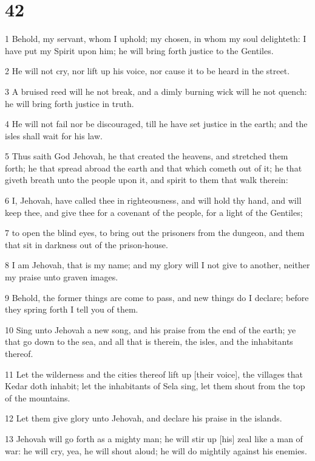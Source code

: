 \chapter{42}

\par 1 Behold, my servant, whom I uphold; my chosen, in whom my soul delighteth: I have put my Spirit upon him; he will bring forth justice to the Gentiles.
\par 2 He will not cry, nor lift up his voice, nor cause it to be heard in the street.
\par 3 A bruised reed will he not break, and a dimly burning wick will he not quench: he will bring forth justice in truth.
\par 4 He will not fail nor be discouraged, till he have set justice in the earth; and the isles shall wait for his law.
\par 5 Thus saith God Jehovah, he that created the heavens, and stretched them forth; he that spread abroad the earth and that which cometh out of it; he that giveth breath unto the people upon it, and spirit to them that walk therein:
\par 6 I, Jehovah, have called thee in righteousness, and will hold thy hand, and will keep thee, and give thee for a covenant of the people, for a light of the Gentiles;
\par 7 to open the blind eyes, to bring out the prisoners from the dungeon, and them that sit in darkness out of the prison-house.
\par 8 I am Jehovah, that is my name; and my glory will I not give to another, neither my praise unto graven images.
\par 9 Behold, the former things are come to pass, and new things do I declare; before they spring forth I tell you of them.
\par 10 Sing unto Jehovah a new song, and his praise from the end of the earth; ye that go down to the sea, and all that is therein, the isles, and the inhabitants thereof.
\par 11 Let the wilderness and the cities thereof lift up [their voice], the villages that Kedar doth inhabit; let the inhabitants of Sela sing, let them shout from the top of the mountains.
\par 12 Let them give glory unto Jehovah, and declare his praise in the islands.
\par 13 Jehovah will go forth as a mighty man; he will stir up [his] zeal like a man of war: he will cry, yea, he will shout aloud; he will do mightily against his enemies.
